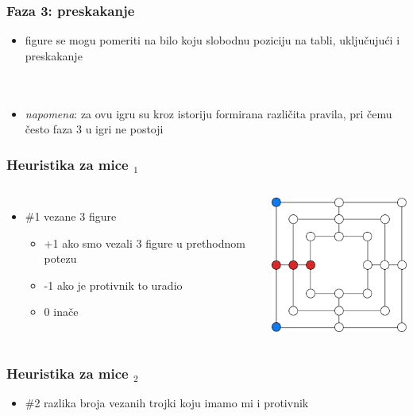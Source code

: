 \documentclass[compress,aspectratio=169]{beamer}
\begin{document}
\begin{frame}[fragile]
  \frametitle{Faza 3: preskakanje}
  \begin{itemize}
    \item figure se mogu pomeriti na bilo koju slobodnu poziciju na tabli, uključujući i preskakanje \\ \ \\ \ \\
    \item \textit{napomena}: za ovu igru su kroz istoriju formirana različita pravila, pri čemu često faza 3 u igri ne postoji
  \end{itemize}
\end{frame}

\begin{frame}[fragile]
  \frametitle{Heuristika za mice $_1$}
  \begin{columns}
    \column{8cm}
    \begin{itemize}
      \item \#1 vezane 3 figure
      \begin{itemize}
        \item +1 ako smo vezali 3 figure u prethodnom potezu
        \item -1 ako je protivnik to uradio
        \item 0 inače
      \end{itemize}
    \end{itemize}
    \column{8cm}
    \begin{center}
      \includegraphics[width=5cm]{prj-01-pic14.pdf}
    \end{center}
  \end{columns}
\end{frame}

\begin{frame}[fragile]
  \frametitle{Heuristika za mice $_2$}
  \begin{itemize}
    \item \#2 razlika broja vezanih trojki koju imamo mi i protivnik
  \end{itemize}
\end{frame}
\end{document}
